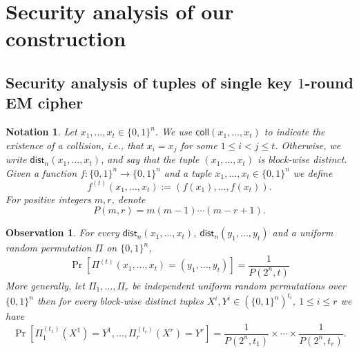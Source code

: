 \documentclass{llncs}
\newcommand{\s}{\{0,1\}}
\newcommand{\tx}{\textsf}
\newtheorem{notat}{Notation}
\newtheorem{obs}{Observation}
\begin{document}
\section{Security analysis of our construction}\label{sec:proof}

\subsection{Security analysis of tuples of single key $1$-round  EM cipher}

\begin{notat}
Let $x_1, \ldots, x_t \in \s^n$.
We use $\tx{coll}(x_1, \ldots, x_t)$ to indicate the existence of a collision, i.e., that
$x_i = x_j$ for some $1 \le i < j \le t$. Otherwise, we write $\tx{dist}_n(x_1, \ldots, x_t)$, and say that the tuple $(x_1, \ldots, x_t)$ is block-wise distinct. Given a function $f : \s^n \rightarrow \s^n$ and a tuple $x_1, \ldots, x_t \in \s^n$ we define $$f^{(t)}(x_1, \ldots, x_t) := (f(x_1), \ldots, f(x_t)).$$
For positive integers $m,r$, denote
$$P(m,r) = m(m-1) \cdots (m-r+1).$$
\end{notat}

\begin{obs}
For every $\tx{dist}_n(x_1, \ldots, x_t)$, $\tx{dist}_n(y_1, \ldots, y_t)$ and a uniform random permutation $\Pi$ on $\s^n$,
\begin{equation*}\label{eq:rp}
\Pr[\Pi^{(t)}(x_1, \ldots, x_t) = (y_1, \ldots, y_t)] = \frac{1}{P(2^n, t)}
\end{equation*}
More generally, let $\Pi_1, \ldots, \Pi_r$ be independent uniform random permutations over $\s^n$ then for every block-wise distinct tuples $X^i, Y^i \in (\s^n)^{t_i}$, $1 \leq i \leq r$ we have
\begin{equation}\label{eq:rp-general}
\Pr[\Pi_1^{(t_1)}(X^1) = Y^1, \ldots, \Pi_r^{(t_r)}(X^r) = Y^r] = \frac{1}{P(2^n,t_1)} \times \cdots \times \frac{1}{P(2^n, t_r)}.
\end{equation}
\end{obs}
\end{document}
